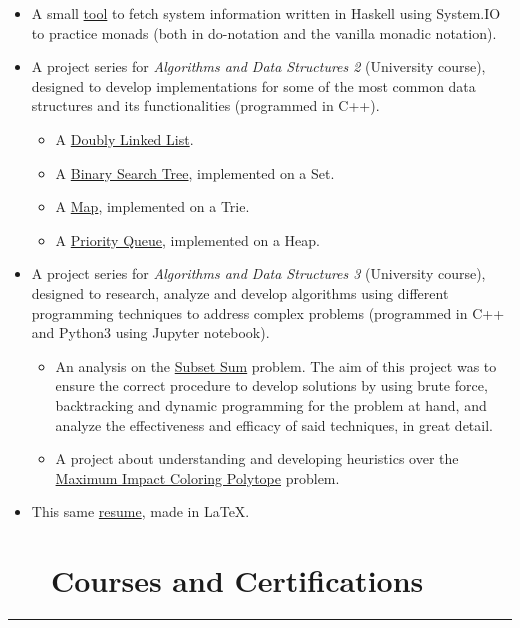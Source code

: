 \documentclass{article}
\begin{document}
\begin{itemize}
	\item A small \href{https://github.com/lucasDS-0/hFetch}{tool} to fetch system information written in Haskell using System.IO to practice monads (both in do-notation and the vanilla monadic notation).
    \item A project series for \textit{Algorithms and Data Structures 2} (University course), designed to develop implementations for some of the most common data structures and its functionalities (programmed in C++).
    \begin{itemize}
        \item A \href{https://github.com/lucasDS-0/Doubly_Linked_List}{Doubly Linked List}.
        \item A \href{https://github.com/lucasDS-0/BST_on_a_set}{Binary Search Tree}, implemented on a Set.
        \item A \href{https://github.com/lucasDS-0/Map_on_a_trie}{Map}, implemented on a Trie.
        \item A \href{https://github.com/lucasDS-0/Priority_queue_on_a_heap}{Priority Queue}, implemented on a Heap.
    \end{itemize}
    \item A project series for \textit{Algorithms and Data Structures 3} (University course), designed to research, analyze and develop algorithms using different programming techniques to address complex problems (programmed in C++ and Python3 using Jupyter notebook).
    \begin{itemize}
        \item An analysis on the \href{https://github.com/lucasDS-0/Subset_sum}{Subset Sum} problem. The aim of this project was to ensure the correct procedure to develop solutions by using brute force, backtracking and dynamic programming for the problem at hand, and analyze the effectiveness and efficacy of said techniques, in great detail.
        \item A project about understanding and developing heuristics over the \href{https://github.com/lucasDS-0/MIC_Polytope}{Maximum Impact Coloring Polytope} problem.
    \end{itemize}
    \item This same \href{https://github.com/lucasDS-0/Resume}{resume}, made in \LaTeX.
\end{itemize}



\section*{\faLaptop ~~ Courses and Certifications} 
\hrule
\end{document}
